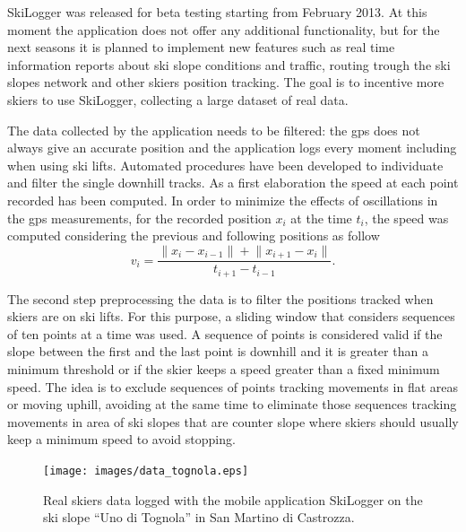 \documentclass[12pt,a4paper,twoside]{book}
\newcommand{\norm}[1]{\lVert#1\rVert}
\begin{document}
SkiLogger was released for beta testing starting from February 2013. At this moment the application does not offer any additional functionality, but for the next seasons it is planned to implement new features such as real time information reports about ski slope conditions and traffic, routing trough the ski slopes network and other skiers position tracking. The goal is to incentive more skiers to use SkiLogger, collecting a large dataset of real data.

The data collected by the application needs to be filtered: the gps does not always give an accurate position and the application logs every moment including when using ski lifts. Automated procedures have been developed to individuate and filter the single downhill tracks. As a first elaboration the speed at each point recorded has been computed. In order to minimize the effects of oscillations in the gps measurements, for the recorded position $x_i$ at the time $t_i$, the speed was computed considering the previous and following positions as follow
\begin{equation}
v_i=\frac{\norm{x_i-x_{i-1}}+\norm{x_{i+1}-x_i}}{t_{i+1}-t_{i-1}}.
\end{equation}

The second step preprocessing the data is to filter the positions tracked when skiers are on ski lifts. For this purpose, a sliding window that considers sequences of ten points at a time was used. A sequence of points is considered valid if the slope between the first and the last point is downhill and it is greater than a minimum threshold or if the skier keeps a speed greater than a fixed minimum speed. The idea is to exclude sequences of points tracking movements in flat areas or moving uphill, avoiding at the same time to eliminate those sequences tracking movements in area of ski slopes that are counter slope where skiers should usually keep a minimum speed to avoid stopping.

\begin{figure}[!b]
  \begin{center}
    \texttt{[image: images/data\_tognola.eps]}
    \caption{Real skiers data logged with the mobile application SkiLogger on the ski slope ``Uno di Tognola'' in San Martino di Castrozza.}\label{data_tognola}
  \end{center}
\end{figure}
\end{document}
